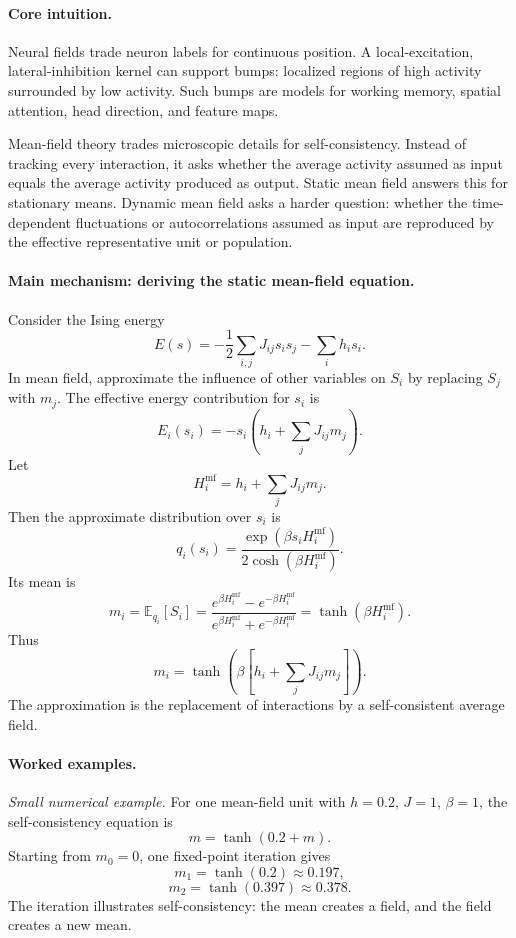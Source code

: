 \paragraph{Core intuition.}
Neural fields trade neuron labels for continuous position. A local-excitation, lateral-inhibition kernel can support bumps: localized regions of high activity surrounded by low activity. Such bumps are models for working memory, spatial attention, head direction, and feature maps.

Mean-field theory trades microscopic details for self-consistency. Instead of tracking every interaction, it asks whether the average activity assumed as input equals the average activity produced as output. Static mean field answers this for stationary means. Dynamic mean field asks a harder question: whether the time-dependent fluctuations or autocorrelations assumed as input are reproduced by the effective representative unit or population.

\paragraph{Main mechanism: deriving the static mean-field equation.}
Consider the Ising energy
\[
E(s)=-\frac12\sum_{i,j}J_{ij}s_i s_j-\sum_i h_i s_i.
\]
In mean field, approximate the influence of other variables on \(S_i\) by replacing \(S_j\) with \(m_j\). The effective energy contribution for \(s_i\) is
\[
E_i(s_i)=-s_i\left(h_i+\sum_j J_{ij}m_j\right).
\]
Let
\[
H_i^{\mathrm{mf}}=h_i+\sum_j J_{ij}m_j.
\]
Then the approximate distribution over \(s_i\) is
\[
q_i(s_i)=\frac{\exp(\beta s_iH_i^{\mathrm{mf}})}
{2\cosh(\beta H_i^{\mathrm{mf}})}.
\]
Its mean is
\[
m_i=\mathbb E_{q_i}[S_i]
=\frac{e^{\beta H_i^{\mathrm{mf}}}-e^{-\beta H_i^{\mathrm{mf}}}}
{e^{\beta H_i^{\mathrm{mf}}}+e^{-\beta H_i^{\mathrm{mf}}}}
=\tanh(\beta H_i^{\mathrm{mf}}).
\]
Thus
\[
m_i=\tanh\left(\beta\left[h_i+\sum_jJ_{ij}m_j\right]\right).
\]
The approximation is the replacement of interactions by a self-consistent average field.

\paragraph{Worked examples.}
\emph{Small numerical example.}
For one mean-field unit with \(h=0.2\), \(J=1\), \(\beta=1\), the self-consistency equation is
\[
m=\tanh(0.2+m).
\]
Starting from \(m_0=0\), one fixed-point iteration gives
\[
m_1=\tanh(0.2)\approx0.197,
\]
\[
m_2=\tanh(0.397)\approx0.378.
\]
The iteration illustrates self-consistency: the mean creates a field, and the field creates a new mean.

